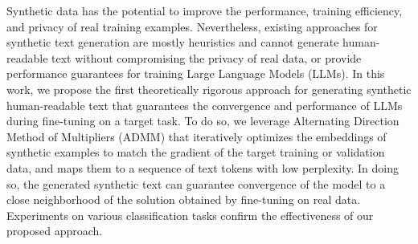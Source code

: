 
Synthetic data has the potential to %
improve the performance, training efficiency, and privacy of real training examples. 
%
Nevertheless, existing approaches for synthetic text generation are mostly heuristics and %
cannot generate human-readable text without compromising the privacy of real data, or provide performance guarantees for training Large Language Models (LLMs). 
%
In this work, we propose the first theoretically rigorous approach for generating synthetic human-readable text that guarantees the convergence and performance of LLMs during fine-tuning on a target task. To do so, we leverage Alternating Direction Method of Multipliers (ADMM) that iteratively optimizes the embeddings of synthetic examples to match the gradient of the target training or validation data, and maps them to a sequence of text tokens with low perplexity. In doing so, the generated synthetic text can guarantee convergence of the model to a close neighborhood of the solution obtained by fine-tuning on real data. 
%
%
Experiments on various classification %
tasks confirm the effectiveness of our proposed approach.

%
%